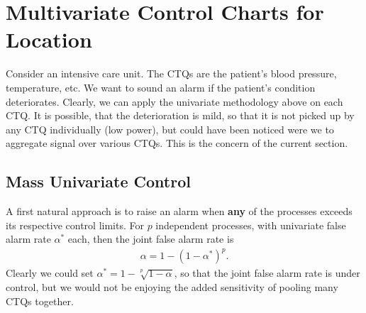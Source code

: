 \section[Multivariate]{Multivariate Control Charts for Location}
\label{sec:multivariate}

\begin{example}
\label{eg:intensive}
Consider an intensive care unit. 
The CTQs are the patient's blood pressure, temperature, etc.
We want to sound an alarm if the patient's condition deteriorates. 
Clearly, we can apply the univariate methodology above on each CTQ.
It is possible, that the deterioration is mild, so that it is not picked up by any CTQ individually (low power), but could have been noticed were we to aggregate signal over various CTQs. 
This is the concern of the current section. 
\end{example}


\subsection{Mass Univariate Control}
\label{sec:mass_univariate}

A first natural approach is to raise an alarm when \textbf{any} of the processes exceeds its respective control limits.
For $p$ independent processes, with univariate false alarm rate $\alpha^*$ each, then the joint false alarm rate is 
\begin{align}
	\alpha = 1-(1-\alpha^*)^p.
\end{align}
Clearly we could set $\alpha^*=1-\sqrt[p]{1-\alpha}$, so that the joint false alarm rate is under control, but we would not be enjoying the added sensitivity of pooling many CTQs together. 



